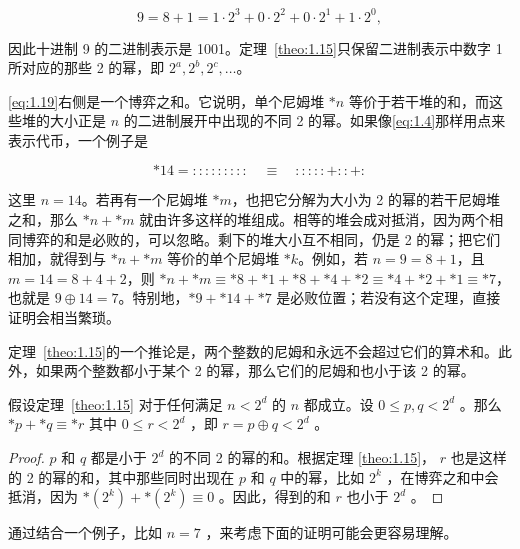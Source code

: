 \[
9 = 8 + 1 = 1 \cdot  {2}^{3} + 0 \cdot  {2}^{2} + 0 \cdot  {2}^{1} + 1 \cdot  {2}^{0},
\]

因此十进制 9 的二进制表示是 1001。定理~\ref{theo:1.15}只保留二进制表示中数字 1 所对应的那些 2 的幂，即 \({2}^{a},{2}^{b},{2}^{c},\ldots\)。

\eqref{eq:1.19}右侧是一个博弈之和。它说明，单个尼姆堆 \(*n\) 等价于若干堆的和，而这些堆的大小正是 \(n\) 的二进制展开中出现的不同 2 的幂。如果像\eqref{eq:1.4}那样用点来表示代币，一个例子是

\[
*14 = ::::::::: \quad\equiv\quad  :::::  +  :: + : 
\]

这里 \(n=14\)。若再有一个尼姆堆 \(*m\)，也把它分解为大小为 2 的幂的若干尼姆堆之和，那么 \(*n+*m\) 就由许多这样的堆组成。相等的堆会成对抵消，因为两个相同博弈的和是必败的，可以忽略。剩下的堆大小互不相同，仍是 2 的幂；把它们相加，就得到与 \(*n+*m\) 等价的单个尼姆堆 \(*k\)。例如，若 \(n=9=8+1\)，且 \(m=14=8+4+2\)，则
\(*n+*m\equiv *8+*1+*8+*4+*2\equiv *4+*2+*1\equiv *7\)，也就是 \(9\oplus14=7\)。特别地，\(*9+*14+*7\) 是必败位置；若没有这个定理，直接证明会相当繁琐。

定理~\ref{theo:1.15}的一个推论是，两个整数的尼姆和永远不会超过它们的算术和。此外，如果两个整数都小于某个 2 的幂，那么它们的尼姆和也小于该 2 的幂。

\begin{lemma}\label{lem:1.16}假设定理~\ref{theo:1.15} 对于任何满足 \(n < {2}^{d}\) 的 \(n\) 都成立。设 \(0 \leq  p,q < {2}^{d}\) 。那么 \(* p +  * q \equiv   * r\) 其中 \(0 \leq  r < {2}^{d}\) ，即 \(r = p \oplus  q < {2}^{d}\) 。
\end{lemma}

\begin{proof} \(p\) 和 \(q\) 都是小于 \({2}^{d}\) 的不同 2 的幂的和。根据定理 \ref{theo:1.15}， \(r\) 也是这样的 2 的幂的和，其中那些同时出现在 \(p\) 和 \(q\) 中的幂，比如 \({2}^{k}\) ，在博弈之和中会抵消，因为 \(* \left( {2}^{k}\right)  +  * \left( {2}^{k}\right)  \equiv  0\) 。因此，得到的和 \(r\) 也小于 \({2}^{d}\) 。
\end{proof}

通过结合一个例子，比如 \(n = 7\) ，来考虑下面的证明可能会更容易理解。

